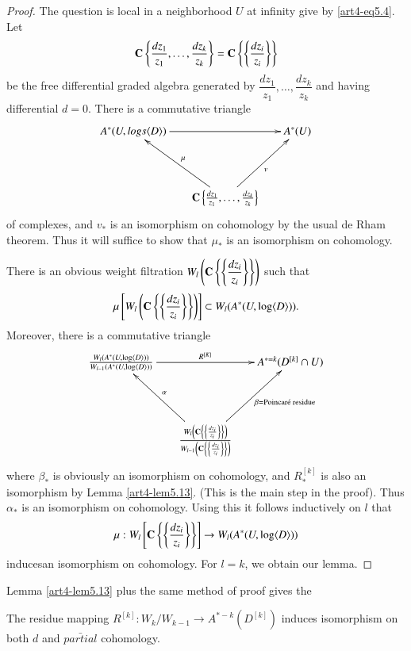 \begin{proof}
The question is local in a neighborhood $U$ at infinity give by \eqref{art4-eq5.4}. Let
$$
\mathbf{C} \left\{\frac{dz_1}{z_1}, \ldots, \frac{dz_k}{z_k} \right\} = \mathbf{C} \left\{ \left\{\frac{dz_i}{z_i} \right\} \right\}
$$
be the free differential graded algebra generated by $\dfrac{dz_1}{z_1} ,\ldots,\dfrac{dz_k}{z_k}$ and having differential $d=0$. There is a commutative triangle
$$
\xymatrix@R=1.5cm@C=.6cm{
A^\ast (U, logs \langle D \rangle) \ar[rr] && A^\ast (U)\\
& \bC \left\{\frac{dz_1}{z_1} , \ldots , \frac{dz_k}{z_k} \right\}  \ar[ur]_v \ar[ul]_{\mu} &
}
$$
\pageoriginale
of complexes, and $v_\ast$ is an isomorphism on cohomology by the usual de Rham theorem. Thus it will suffice to show that $\mu_{\ast}$ is an isomorphism on cohomology.

There is an obvious weight filtration $W_l \left(\mathbf{C} \left\{\left\{\dfrac{dz_i}{z_i} \right\} \right\} \right)$ such that 
$$
\mu \left[W_l \left(\mathbf{C}\left\{ \left\{ \frac{dz_i}{z_i}\right\}  \right\}\right) \right] \subset W_l (A^\ast (U, \log \langle D \rangle)).
$$
Moreover, there is a commutative triangle
$$
\xymatrix@R=1.5cm@C=.6cm{
\frac{W_l (A^\ast (U, \log \langle D \rangle))}{W_{l-1} (A^\ast (U, \log \langle D \rangle))}  \ar[rr]^-{R^{[K]}} && A^{\ast =k } (D^{[k]} \cap U)\\
& \frac{W_l \left(\bC \left\{ \left\{ \frac{dz_i}{z_i} \right\} \right\}\right)}{W_{l-1} \left(\bC \left\{ \left\{ \frac{dz_i}{z_i}  \right\} \right\} \right)} \ar[ur]_-{\beta = \text{Poincar\'e residue}} \ar[ul]_-{\alpha} & 
}
$$
where $\beta_\ast$ is obviously an isomorphism on cohomology, and $R^{[k]}_\ast$ is also an isomorphism by Lemma \eqref{art4-lem5.13}. (This is the main step in the proof). Thus $\alpha_\ast$ is an isomorphism on cohomology. Using this it follows inductively on $l$ that
$$
\mu : W_l \left[ \mathbf{C} \left\{ \left\{ \frac{dz_i}{z_i} \right\} \right\} \right] \to W_l (A^\ast (U, \log \langle D \rangle))
$$
induces\pageoriginale an isomorphism on cohomology. For $l=k$, we obtain our lemma.
\end{proof}

\begin{remark*}
Lemma \ref{art4-lem5.13} plus the same method of proof gives the 
\end{remark*}

\begin{coro}\label{art4-coro5.15}
The residue mapping $R^{[k]} : W_k / W_{k-1} \to A^{\ast -k} (D^{[k]})$ induces isomorphism on both $d$ and $\bar{partial}$ cohomology.
\end{coro}

